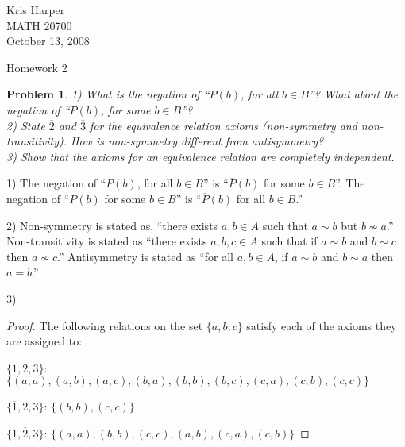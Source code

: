 \documentclass{article}
\newtheorem{problem}{Problem}
\begin{document}
\begin{flushright}
Kris Harper\\

MATH 20700\\

October 13, 2008
\end{flushright}

\begin{center}
Homework 2
\end{center}

\begin{flushleft}

\begin{problem}
1) What is the negation of ``$P(b)$, for all $b \in B$''? What about the negation of ``$P(b)$, for some $b \in B$''?\\
2) State $\overline{2}$ and $\overline{3}$ for the equivalence relation axioms (non-symmetry and non-transitivity). How is non-symmetry different from antisymmetry?\\
3) Show that the axioms for an equivalence relation are completely independent.\newline
\end{problem}

1) The negation of ``$P(b)$, for all $b \in B$'' is ``$\overline{P}(b)$ for some $b \in B$''. The negation of ``$P(b)$ for some $b \in B$'' is ``$\overline{P}(b)$ for all $b \in B$.''\newline

2) Non-symmetry is stated as, ``there exists $a,b \in A$ such that $a \sim b$ but $b \nsim a$.'' Non-transitivity is stated as ``there exists $a,b,c \in A$ such that if $a \sim b$ and $b \sim c$ then $a \nsim c$.'' Antisymmetry is stated as ``for all $a,b \in A$, if $a \sim b$ and $b \sim a$ then $a = b$.''\newline

3)\begin{proof}
The following relations on the set $\{a,b,c\}$ satisfy each of the axioms they are assigned to:\newline

$\{1, 2, 3\}$: $\{(a,a), (a,b), (a,c), (b,a), (b,b), (b,c), (c,a), (c,b), (c,c)\}$\newline

$\{\overline{1}, 2, 3\}$: $\{(b,b), (c,c)\}$\newline

$\{1, \overline{2}, 3\}$: $\{(a,a), (b,b), (c,c), (a,b), (c,a), (c,b)\}$\newline


\end{proof}
\end{flushleft}
\end{document}
